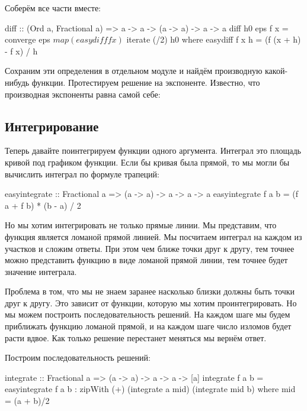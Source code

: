 Соберём все части вместе:


\begin{code}
diff :: (Ord a, Fractional a) => a -> a -> (a -> a) -> a -> a
diff h0 eps f x = converge eps $ map (easydiff f x) $ iterate (/2) h0
    where easydiff f x h = (f (x + h) - f x) / h
\end{code}

Сохраним эти определения в отдельном модуле и найдём производную
какой-нибудь функции. Протестируем решение на экспоненте. Известно, что
производная экспоненты равна самой себе:



\subsection{Интегрирование}

Теперь давайте поинтегрируем функции одного аргумента. Интеграл это
площадь кривой под графиком функции. Если бы кривая была прямой, то мы
могли бы вычислить интеграл по формуле трапеций:


\begin{code}
easyintegrate :: Fractional a => (a -> a) -> a -> a -> a
easyintegrate f a b = (f a + f b) * (b - a) / 2
\end{code}

Но мы хотим интегрировать не только прямые линии. Мы представим, что
функция является ломаной прямой линией. Мы посчитаем интеграл на каждом
из участков и сложим ответы. При этом чем ближе точки друг к другу, тем
точнее можно представить функцию в виде ломаной прямой линии, тем точнее
будет значение интеграла.

Проблема в том, что мы не знаем заранее насколько близки должны быть
точки друг к другу. Это зависит от функции, которую мы хотим
проинтегрировать. Но мы можем построить последовательность решений. На
каждом шаге мы будем приближать функцию ломаной прямой, и на каждом шаге
число изломов будет расти вдвое. Как только решение перестанет меняться
мы вернём ответ.

Построим последовательность решений:


\begin{code}
integrate :: Fractional a => (a -> a) -> a -> a -> [a]
integrate f a b = easyintegrate f a b : 
    zipWith (+) (integrate a mid) (integrate mid b)
    where mid = (a + b)/2
\end{code}

